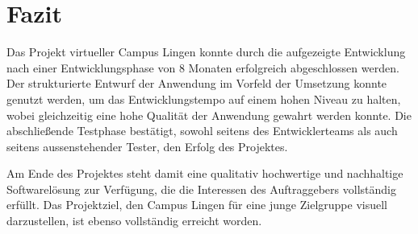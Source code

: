 \section{Fazit}
\label{sec:Fazit}

Das Projekt virtueller Campus Lingen konnte durch die aufgezeigte Entwicklung nach einer Entwicklungsphase von 8 Monaten
erfolgreich abgeschlossen werden.
Der strukturierte Entwurf der Anwendung im Vorfeld der Umsetzung konnte genutzt werden, um das Entwicklungstempo
auf einem hohen Niveau zu halten, wobei gleichzeitig eine hohe Qualität der Anwendung gewahrt werden konnte.
Die abschließende Testphase bestätigt, sowohl seitens des Entwicklerteams als auch seitens aussenstehender
Tester, den Erfolg des Projektes.

Am Ende des Projektes steht damit eine qualitativ hochwertige und nachhaltige Softwarelösung zur Verfügung, die die Interessen
des Auftraggebers vollständig erfüllt. Das Projektziel, den Campus Lingen für eine
junge Zielgruppe visuell darzustellen, ist ebenso vollständig erreicht worden.